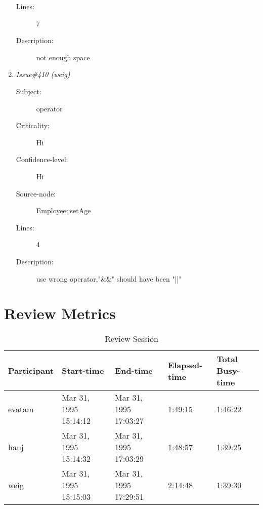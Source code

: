 \begin{enumerate}
\begin{description}
\item [Lines:] 7

\item [Description:] not enough space
\end{description}
\item {\it Issue\#410 (weig)}
\begin{description}
\item [Subject:] operator
\item [Criticality:] Hi
\item [Confidence-level:] Hi
\item [Source-node:] Employee::setAge

\item [Lines:] 4

\item [Description:] use wrong operator,"\&\&" should have been "||"
\end{description}
\end{enumerate}
\section{Review Metrics}
\begin{table}[hb]
\begin{center}
\begin{tabular}{|l|l|l|l|l|}
\hline
Participant & Start-time & End-time & Elapsed-time & Total Busy-time \\
\hline
evatam & Mar 31, 1995 15:14:12 & Mar 31, 1995 17:03:27 & 1:49:15 & 1:46:22 \\
hanj & Mar 31, 1995 15:14:32 & Mar 31, 1995 17:03:29 & 1:48:57 & 1:39:25 \\
weig & Mar 31, 1995 15:15:03 & Mar 31, 1995 17:29:51 & 2:14:48 & 1:39:30 \\
\hline
\end{tabular}
\end{center}
\caption{Review Session}
\end{table}


